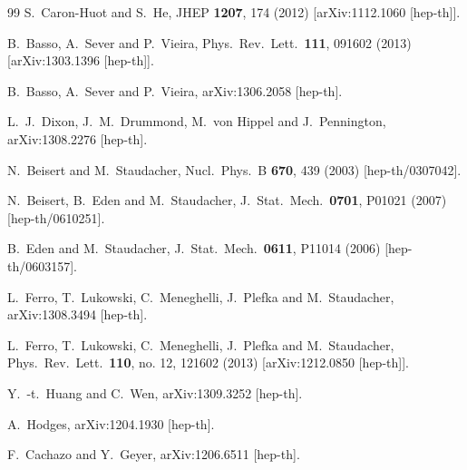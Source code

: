 \documentclass[12pt,nohyper,twosided]{JHEP3}
\begin{document}
\begin{thebibliography}{99}
  S.~Caron-Huot and S.~He,
  JHEP {\bf 1207}, 174 (2012)
  [arXiv:1112.1060 [hep-th]].

  B.~Basso, A.~Sever and P.~Vieira,
  Phys.\ Rev.\ Lett.\  {\bf 111}, 091602 (2013)
  [arXiv:1303.1396 [hep-th]].

  B.~Basso, A.~Sever and P.~Vieira,
  arXiv:1306.2058 [hep-th].

  L.~J.~Dixon, J.~M.~Drummond, M.~von Hippel and J.~Pennington,
  arXiv:1308.2276 [hep-th].

  N.~Beisert and M.~Staudacher,
  Nucl.\ Phys.\ B {\bf 670}, 439 (2003)
  [hep-th/0307042].

  N.~Beisert, B.~Eden and M.~Staudacher,
  J.\ Stat.\ Mech.\  {\bf 0701}, P01021 (2007)
  [hep-th/0610251].

  B.~Eden and M.~Staudacher,
  J.\ Stat.\ Mech.\  {\bf 0611}, P11014 (2006)
  [hep-th/0603157].

  L.~Ferro, T.~Lukowski, C.~Meneghelli, J.~Plefka and M.~Staudacher,
  arXiv:1308.3494 [hep-th].

  L.~Ferro, T.~Lukowski, C.~Meneghelli, J.~Plefka and M.~Staudacher,
  Phys.\ Rev.\ Lett.\  {\bf 110}, no. 12, 121602 (2013)
  [arXiv:1212.0850 [hep-th]].

  Y.~-t.~Huang and C.~Wen,
  arXiv:1309.3252 [hep-th].

  A.~Hodges,
  arXiv:1204.1930 [hep-th].

  F.~Cachazo and Y.~Geyer,
  arXiv:1206.6511 [hep-th].


\end{thebibliography}
\end{document}
